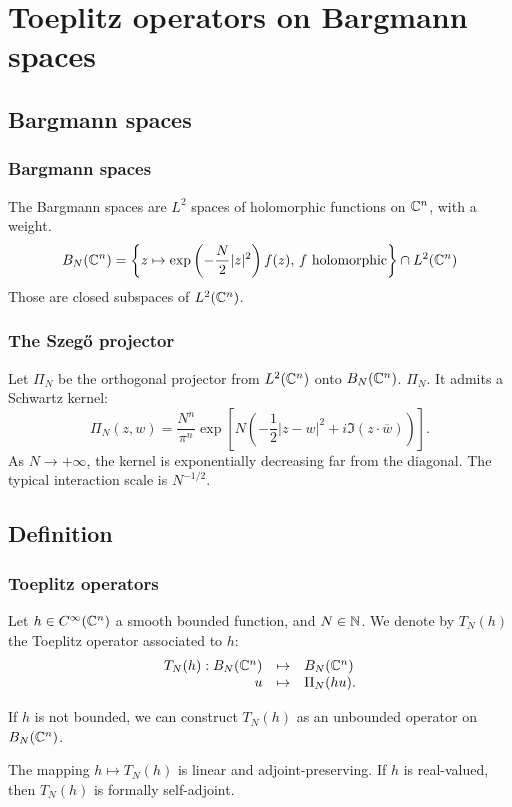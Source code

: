 \documentclass[mathserif]{beamer}
\begin{document}
\section{Toeplitz operators on Bargmann spaces}
\subsection{Bargmann spaces}
\begin{frame}\frametitle{Bargmann spaces}
	The Bargmann spaces are $L^2$ spaces of holomorphic functions
        on $\mathbb{C}^n$, with a weight.
	\begin{equation*}
		B_N(\mathbb{C}^n)=\left\{z\mapsto \exp\left(-\frac N2|z|^2\right)f(z),\,f\text{ holomorphic}\right\}\cap L^2(\mathbb{C}^n)
	\end{equation*}
	Those are closed subspaces of $L^2(\mathbb{C}^n)$.
\end{frame}
\begin{frame}\frametitle{The Szeg\H{o} projector}
	Let $\Pi_N$ be the orthogonal projector from $L^2(\mathbb{C}^n)$ onto
        $B_N(\mathbb{C}^n)$. $\Pi_N$. It admits a Schwartz kernel:
	\begin{equation*}
		\Pi_N(z,w)=\frac{N^n}{\pi^n}\exp\left[N(-\frac 12 |z-w|^2+i\Im(z\cdot \overline{w}))\right].
	\end{equation*}
	As $N\to +\infty$, the kernel is exponentially decreasing far
        from the diagonal. The typical interaction scale is $N^{-1/2}$.
\end{frame}
\subsection{Definition}
\begin{frame}
\frametitle{Toeplitz operators}
\begin{defn}
	Let $h\in C^{\infty}(\mathbb{C}^n)$ a smooth bounded function, and
        $N\in \mathbb{N}$. We denote by $T_N(h)$ the Toeplitz operator
        associated to $h$:
	\begin{equation*}
		\begin{array}{rcl}
		T_N(h):B_N(\mathbb{C}^n)&\mapsto & B_N(\mathbb{C}^n)\\
		u& \mapsto& \Pi_N(hu).
		\end{array}
	\end{equation*}
\end{defn}
If $h$ is not bounded, we can construct $T_N(h)$ as an unbounded
operator on $B_N(\mathbb{C}^n)$. 

The mapping $h\mapsto T_N(h)$ is linear and adjoint-preserving. If $h$
is real-valued, then $T_N(h)$ is formally self-adjoint.
\end{frame}
\end{document}
